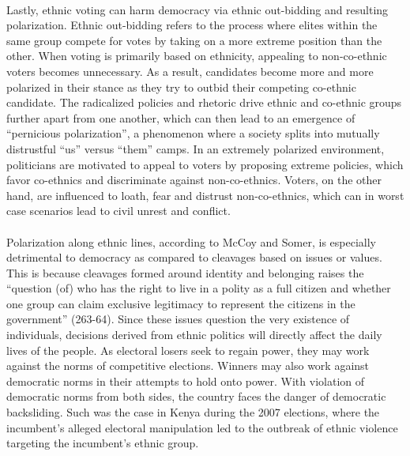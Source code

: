 \documentclass[a4paper, 12pt]{article}
\begin{document}
\paragraph{}
Lastly, ethnic voting can harm democracy via ethnic out-bidding and resulting polarization. Ethnic out-bidding refers to the process where elites within the same group compete for votes by taking on a more extreme position than the other. When voting is primarily based on ethnicity, appealing to non-co-ethnic voters becomes unnecessary. As a result, candidates become more and more polarized in their stance as they try to outbid their competing co-ethnic candidate. The radicalized policies and rhetoric drive ethnic and co-ethnic groups further apart from one another, which can then lead to an emergence of “pernicious polarization”, a phenomenon where a society splits into mutually distrustful “us” versus “them” camps\cite{mccoyPolarizationGlobalCrisis2018}. In an extremely polarized environment, politicians are motivated to appeal to voters by proposing extreme policies, which favor co-ethnics and discriminate against non-co-ethnics. Voters, on the other hand, are influenced to loath, fear and distrust non-co-ethnics, which can in worst case scenarios lead to civil unrest and conflict\cite{bhavnaniEthnicPolarizationEthnic2009, devottaEthnicOutbiddingEthnic2005}.
\paragraph{}
Polarization along ethnic lines, according to McCoy and Somer\cite{mccoyTheoryPerniciousPolarization2019}, is especially detrimental to democracy as compared to cleavages based on issues or values. This is because cleavages formed around identity and belonging raises the “question (of) who has the right to live in a polity as a full citizen and whether one group can claim exclusive legitimacy to represent the citizens in the government”\cite{mccoyTheoryPerniciousPolarization2019} (263-64). Since these issues question the very existence of individuals, decisions derived from ethnic politics will directly affect the daily lives of the people. As electoral losers seek to regain power, they may work against the norms of competitive elections. Winners may also work against democratic norms in their attempts to hold onto power\cite{mckennaAreDiverseSocieties2018}. With violation of democratic norms from both sides, the country faces the danger of democratic backsliding. Such was the case in Kenya during the 2007 elections, where the incumbent’s alleged electoral manipulation led to the outbreak of ethnic violence targeting the incumbent’s ethnic group.
\end{document}
